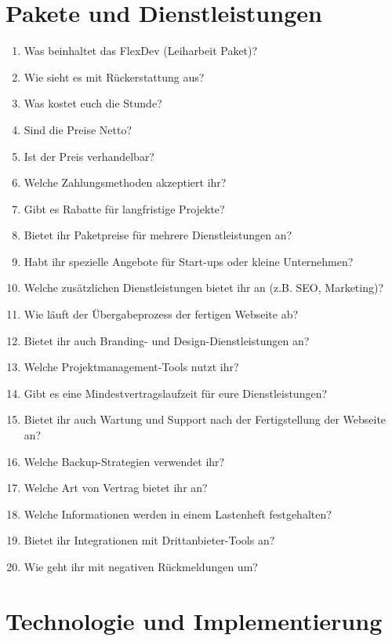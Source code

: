 \documentclass[a4paper,12pt]{article}
\begin{document}
\section*{Pakete und Dienstleistungen}

\begin{enumerate}[resume]
    \item Was beinhaltet das FlexDev (Leiharbeit Paket)?
    \item Wie sieht es mit Rückerstattung aus?
    \item Was kostet euch die Stunde?
    \item Sind die Preise Netto?
    \item Ist der Preis verhandelbar?
    \item Welche Zahlungsmethoden akzeptiert ihr?
    \item Gibt es Rabatte für langfristige Projekte?
    \item Bietet ihr Paketpreise für mehrere Dienstleistungen an?
    \item Habt ihr spezielle Angebote für Start-ups oder kleine Unternehmen?
    \item Welche zusätzlichen Dienstleistungen bietet ihr an (z.B. SEO, Marketing)?
    \item Wie läuft der Übergabeprozess der fertigen Webseite ab?
    \item Bietet ihr auch Branding- und Design-Dienstleistungen an?
    \item Welche Projektmanagement-Tools nutzt ihr?
    \item Gibt es eine Mindestvertragslaufzeit für eure Dienstleistungen?
    \item Bietet ihr auch Wartung und Support nach der Fertigstellung der Webseite an?
    \item Welche Backup-Strategien verwendet ihr?
    \item Welche Art von Vertrag bietet ihr an?
    \item Welche Informationen werden in einem Lastenheft festgehalten?
    \item Bietet ihr Integrationen mit Drittanbieter-Tools an?
    \item Wie geht ihr mit negativen Rückmeldungen um?
\end{enumerate}

\section*{Technologie und Implementierung}
\end{document}
